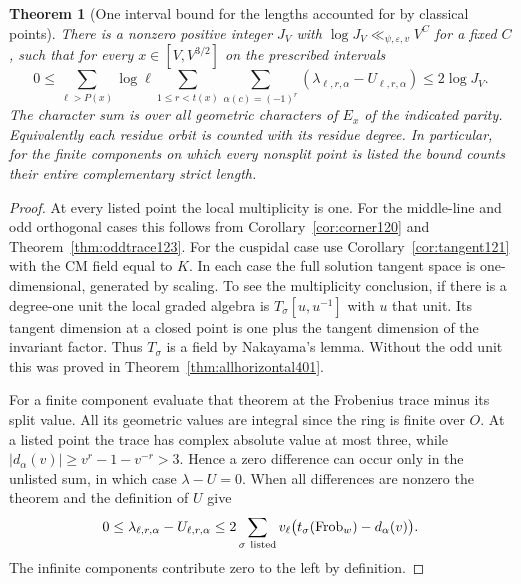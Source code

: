 \documentclass[a4paper,11pt]{article}
\newtheorem{theorem}[proposition]{Theorem}
\theoremstyle{definition}
\theoremstyle{remark}
\numberwithin{equation}{section}
\begin{document}
\begin{theorem}[One interval bound for the lengths accounted for by classical points]\leavevmode
\label{thm:gaussianbudget401}
There is a nonzero positive integer \(J_V\) with
\(\log J_V\ll_{\psi,\varepsilon,v} V^C\) for a fixed \(C\), such
that for every \(x\in[V,V^{3/2}]\) on the prescribed intervals
\[
 0\le \sum_{\ell>P(x)}\log\ell\sum_{1\le r<t(x)}
       \sum_{\alpha(c)=(-1)^r}
       (\lambda_{\ell,r,\alpha}-U_{\ell,r,\alpha})
       \le 2\log J_V .
\]
The character sum is over all geometric characters of \(E_x\)
of the indicated parity. Equivalently each residue orbit is
counted with its residue degree. In particular, for the finite
components on which every nonsplit point is listed the bound
counts their entire complementary strict length.
\end{theorem}
\begin{proof}
At every listed point the local multiplicity is one. For the
middle-line and odd orthogonal cases this follows from
Corollary~\ref{cor:corner120} and Theorem~\ref{thm:oddtrace123}.
For the cuspidal case use Corollary~\ref{cor:tangent121} with the
CM field equal to \(K\). In each case the full solution tangent
space is one-dimensional, generated by scaling. To see the
multiplicity conclusion, if there is a degree-one unit the local
graded algebra is \(T_\sigma[u,u^{-1}]\) with \(u\) that unit.
Its tangent dimension at a closed point is one plus the tangent
dimension of the invariant factor. Thus \(T_\sigma\) is a field
by Nakayama's lemma. Without the odd unit this was proved in
Theorem~\ref{thm:allhorizontal401}.

For a finite component evaluate that theorem at the Frobenius
trace minus its split value. All its geometric values are
integral since the ring is finite over \(O\). At a listed point
the trace has complex absolute value at most three, while
\(|d_\alpha(v)|\ge v^r-1-v^{-r}>3\). Hence a zero difference
can occur only in the unlisted sum, in which case
\(\lambda-U=0\). When all differences are nonzero the theorem
and the definition of \(U\) give
\[
 0\le\lambda_{\ell,r,\alpha}-U_{\ell,r,\alpha}
   \le 2\sum_{\sigma\ {\rm listed}}
           v_\ell\bigl(t_\sigma(\operatorname{Frob}_w)-d_\alpha(v)\bigr).
\]
The infinite components contribute zero to the left by definition.


\end{proof}
\end{document}
